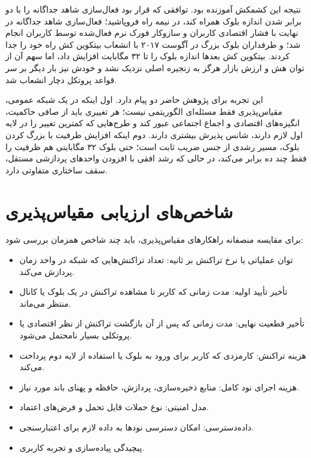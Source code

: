 نتیجه این کشمکش آموزنده بود. توافقی که قرار بود فعال‌سازی شاهد جداگانه را با دو برابر شدن اندازه بلوک همراه کند، در نیمه راه فروپاشید؛ فعال‌سازی شاهد جداگانه در نهایت با فشار اقتصادی کاربران و سازوکار فورک نرم فعال‌شده توسط کاربران انجام شد؛ و طرفداران بلوک بزرگ در آگوست ۲۰۱۷ با انشعاب بیتکوین کش راه خود را جدا کردند. بیتکوین کش بعدها اندازه بلوک را تا ۳۲ مگابایت افزایش داد، اما سهم آن از توان هش و ارزش بازار هرگز به زنجیره اصلی نزدیک نشد و خودش نیز بار دیگر بر سر قواعد پروتکل دچار انشعاب شد.

این تجربه برای پژوهش حاضر دو پیام دارد. اول اینکه در یک شبکه عمومی، مقیاس‌پذیری فقط مسئله‌ای الگوریتمی نیست؛ هر تغییری باید از صافی حاکمیت، انگیزه‌های اقتصادی و اجماع اجتماعی عبور کند و طرح‌هایی که کمترین تغییر را در لایه اول لازم دارند، شانس پذیرش بیشتری دارند. دوم اینکه افزایش ظرفیت با بزرگ کردن بلوک، مسیر رشدی از جنس ضریب ثابت است؛ حتی بلوک ۳۲ مگابایتی هم ظرفیت را فقط چند ده برابر می‌کند، در حالی که رشد افقی با افزودن واحدهای پردازشی مستقل، سقف ساختاری متفاوتی دارد.

\section{شاخص‌های ارزیابی مقیاس‌پذیری}

برای مقایسه منصفانه راهکارهای مقیاس‌پذیری، باید چند شاخص همزمان بررسی شود:

\begin{itemize}
\item توان عملیاتی یا نرخ تراکنش بر ثانیه: تعداد تراکنش‌هایی که شبکه در واحد زمان پردازش می‌کند.
\item تأخیر تأیید اولیه: مدت زمانی که کاربر تا مشاهده تراکنش در یک بلوک یا کانال منتظر می‌ماند.
\item تأخیر قطعیت نهایی: مدت زمانی که پس از آن بازگشت تراکنش از نظر اقتصادی یا پروتکلی بسیار نامحتمل می‌شود.
\item هزینه تراکنش: کارمزدی که کاربر برای ورود به بلوک یا استفاده از لایه دوم پرداخت می‌کند.
\item هزینه اجرای نود کامل: منابع ذخیره‌سازی، پردازش، حافظه و پهنای باند مورد نیاز.
\item مدل امنیتی: نوع حملات قابل تحمل و فرض‌های اعتماد.
\item داده‌دسترسی: امکان دسترسی نودها به داده لازم برای اعتبارسنجی.
\item پیچیدگی پیاده‌سازی و تجربه کاربری.
\end{itemize}

